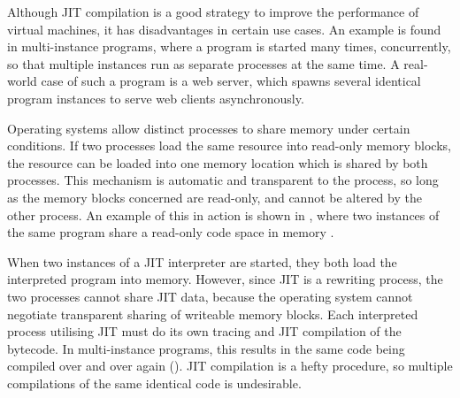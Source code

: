 		Although JIT compilation is a good strategy to improve the performance of virtual machines, it has disadvantages in certain use cases. An example is found in multi-instance programs, where a program is started many times, concurrently, so that multiple instances run as separate processes at the same time. A real-world case of such a program is a  web server, which spawns several identical program instances to serve web clients asynchronously.
		
		Operating systems allow distinct processes to share memory under certain conditions. If two processes load the same resource into read-only memory blocks, the resource can be loaded into one memory location which is shared by both processes. This mechanism is automatic and transparent to the process, so long as the memory blocks concerned are read-only, and cannot be altered by the other process. An example of this in action is shown in , where two instances of the same program share a read-only code space in memory \citep{sharedcodepatent}. 
		
		When two instances of a JIT interpreter are started, they both load the interpreted program into memory. However, since JIT is a rewriting process, the two processes cannot share JIT data, because the operating system cannot negotiate transparent sharing of writeable memory blocks. Each interpreted process utilising JIT must do its own tracing and JIT compilation of the bytecode. In multi-instance programs, this results in the same code being compiled over and over again (). JIT compilation is a hefty procedure, so multiple compilations of the same identical code is undesirable. 
		

